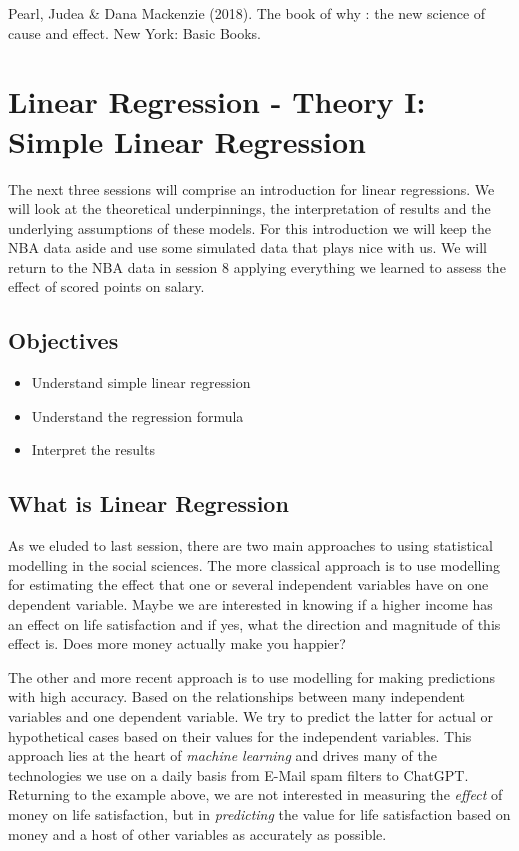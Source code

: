 \documentclass[
]{book}
\providecommand{\tightlist}{%
  \setlength{\itemsep}{0pt}\setlength{\parskip}{0pt}}
\begin{document}
Pearl, Judea \& Dana Mackenzie (2018). The book of why : the new science
of cause and effect. New York: Basic Books.

\hypertarget{lin-t-1}{%
\chapter{Linear Regression - Theory I: Simple Linear Regression}\label{lin-t-1}}

The next three sessions will comprise an introduction for linear regressions.
We will look at the theoretical underpinnings, the interpretation of results
and the underlying assumptions of these models. For this introduction we will
keep the NBA data aside and use some simulated data that plays nice with us.
We will return to the NBA data in session 8 applying everything we
learned to assess the effect of scored points on salary.

\hypertarget{objectives-2}{%
\section{Objectives}\label{objectives-2}}

\begin{itemize}
\tightlist
\item
  Understand simple linear regression
\item
  Understand the regression formula
\item
  Interpret the results
\end{itemize}

\hypertarget{what-is-linear-regression}{%
\section{What is Linear Regression}\label{what-is-linear-regression}}

As we eluded to last session, there are two main approaches to using
statistical modelling in the social sciences.
The more classical approach is to use modelling for estimating the effect that
one or several independent variables have on one dependent variable. Maybe we
are interested in knowing if a higher income has an effect on life satisfaction
and if yes, what the direction and magnitude of this effect is. Does more money
actually make you happier?

The other and more recent approach is to use modelling for making predictions
with high accuracy. Based on the relationships between many independent
variables and one dependent variable. We try to predict the latter for actual
or hypothetical cases based on their values for the independent variables.
This approach lies at the heart of \emph{machine learning} and drives many of the
technologies we use on a daily basis from E-Mail spam filters to ChatGPT.
Returning to the example above, we are not interested in measuring the \emph{effect}
of money on life satisfaction, but in \emph{predicting} the value for life satisfaction
based on money and a host of other variables as accurately as possible.
\end{document}
